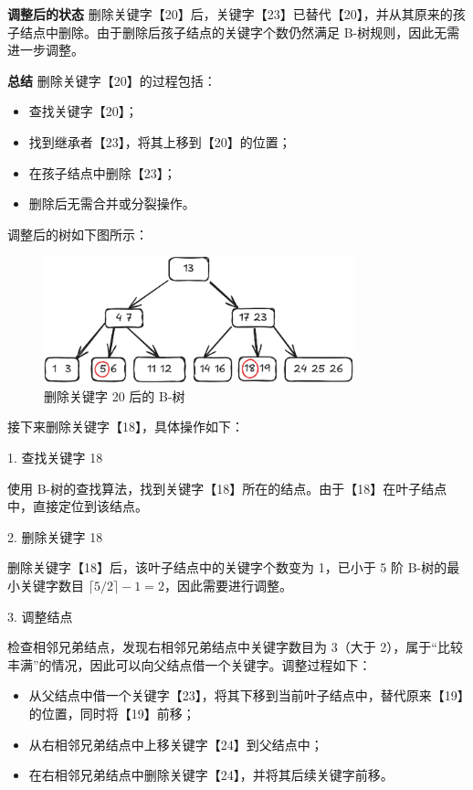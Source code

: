 \documentclass[lang=cn,newtx,10pt,scheme=chinese]{elegantbook}
\begin{document}
     
     \textbf{调整后的状态}  
     删除关键字【20】后，关键字【23】已替代【20】，并从其原来的孩子结点中删除。由于删除后孩子结点的关键字个数仍然满足 B-树规则，因此无需进一步调整。
     
     
     \textbf{总结}  
     删除关键字【20】的过程包括：
     \begin{itemize}
       \item 查找关键字【20】；
       \item 找到继承者【23】，将其上移到【20】的位置；
       \item 在孩子结点中删除【23】；
       \item 删除后无需合并或分裂操作。
     \end{itemize}

     调整后的树如下图所示：
     \begin{figure}[h!]
        
          \centering
          \includegraphics[width=0.8\textwidth]{./figure/pdf/cropped/Btree_del3.pdf}
          \caption{删除关键字 20 后的 B-树}
          \label{fig:Btree_delete_20}
     \end{figure}

     接下来删除关键字【18】，具体操作如下：

     1. 查找关键字 18  

        使用 B-树的查找算法，找到关键字【18】所在的结点。由于【18】在叶子结点中，直接定位到该结点。
     
     2. 删除关键字 18  

        删除关键字【18】后，该叶子结点中的关键字个数变为 1，已小于 5 阶 B-树的最小关键字数目 $\lceil 5/2 \rceil - 1 = 2$，因此需要进行调整。
     
     3. 调整结点  

        检查相邻兄弟结点，发现右相邻兄弟结点中关键字数目为 3（大于 2），属于“比较丰满”的情况，因此可以向父结点借一个关键字。调整过程如下：
        \begin{itemize}
          \item 从父结点中借一个关键字【23】，将其下移到当前叶子结点中，替代原来【19】的位置，同时将【19】前移；
          \item 从右相邻兄弟结点中上移关键字【24】到父结点中；
          \item 在右相邻兄弟结点中删除关键字【24】，并将其后续关键字前移。
        \end{itemize}
     
\end{document}
